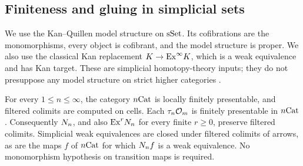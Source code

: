 \subsection{Finiteness and gluing in simplicial sets}

We use the Kan--Quillen model structure on $\mathrm{sSet}$.  Its cofibrations
are the monomorphisms, every object is cofibrant, and the model
structure is proper.  We also use the classical Kan replacement
$K\to\mathrm{Ex}^\infty K$, which is a weak equivalence and has Kan target.
These are simplicial homotopy-theory inputs; they do not presuppose
any model structure on strict higher categories
\cite[II.8.6 and III.4.8]{GoerssJardine1999}.

\begin{lemma}\label{lem:filtered}
For every $1\le n\le\infty$, the category $n\mathrm{Cat}$ is locally finitely
presentable, and filtered colimits are computed on cells.
Each $\tau_n\mathcal O_{m}$ is finitely presentable in $n\mathrm{Cat}$.
Consequently $N_n$, and also $\mathrm{Ex}^rN_n$ for every finite
$r\ge0$, preserve filtered colimits.  Simplicial weak equivalences
are closed under filtered colimits of arrows, as are the maps
$f$ of $n\mathrm{Cat}$ for which $N_n f$ is a weak equivalence.
No monomorphism hypothesis on transition maps is required.
\end{lemma}

